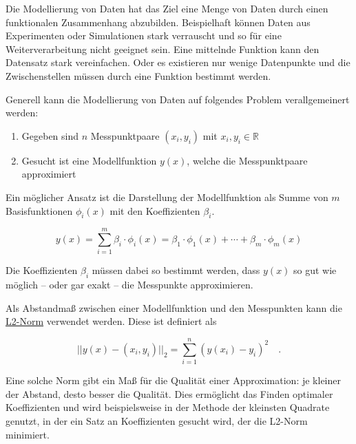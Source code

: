 \documentclass[
  letterpaper,
  DIV=11,
  numbers=noendperiod]{scrreprt}
\providecommand{\tightlist}{%
  \setlength{\itemsep}{0pt}\setlength{\parskip}{0pt}}\usepackage{longtable,booktabs,array}
\begin{document}
\begin{tcolorbox}[enhanced jigsaw, left=2mm, leftrule=.75mm, bottomrule=.15mm, title=\textcolor{quarto-callout-note-color}{\faInfo}\hspace{0.5em}{Theorie - Modellierung}, colback=white, arc=.35mm, breakable, titlerule=0mm, bottomtitle=1mm, colbacktitle=quarto-callout-note-color!10!white, toprule=.15mm, opacityback=0, coltitle=black, rightrule=.15mm, opacitybacktitle=0.6, toptitle=1mm, colframe=quarto-callout-note-color-frame]

Die Modellierung von Daten hat das Ziel eine Menge von Daten durch einen
funktionalen Zusammenhang abzubilden. Beispielhaft können Daten aus
Experimenten oder Simulationen stark verrauscht und so für eine
Weiterverarbeitung nicht geeignet sein. Eine mittelnde Funktion kann den
Datensatz stark vereinfachen. Oder es existieren nur wenige Datenpunkte
und die Zwischenstellen müssen durch eine Funktion bestimmt werden.

Generell kann die Modellierung von Daten auf folgendes Problem
verallgemeinert werden:

\begin{enumerate}
\def\labelenumi{\arabic{enumi}.}
\tightlist
\item
  Gegeben sind \(n\) Messpunktpaare \((x_i, y_i)\) mit
  \(x_i, y_i \in \mathbb{R}\)
\item
  Gesucht ist eine Modellfunktion \(y(x)\), welche die Messpunktpaare
  approximiert
\end{enumerate}

Ein möglicher Ansatz ist die Darstellung der Modellfunktion als Summe
von \(m\) Basisfunktionen \(\phi_i(x)\) mit den Koeffizienten
\(\beta_i\).

\[  y(x) = \sum_{i=1}^{m}\beta_i \cdot \phi_i(x) = \beta_1\cdot \phi_1(x) + \cdots + \beta_m\cdot \phi_m(x) \]

Die Koeffizienten \(\beta_i\) müssen dabei so bestimmt werden, dass
\(y(x)\) so gut wie möglich -- oder gar exakt -- die Messpunkte
approximieren.

Als Abstandmaß zwischen einer Modellfunktion und den Messpunkten kann
die \href{https://de.wikipedia.org/wiki/Folgenraum\#lp}{L2-Norm}
verwendet werden. Diese ist definiert als

\[  || y(x) - (x_i, y_i) ||_2 = \sum_{i=1}^n \left(y(x_i) - y_i\right)^2 \quad .\]

Eine solche Norm gibt ein Maß für die Qualität einer Approximation: je
kleiner der Abstand, desto besser die Qualität. Dies ermöglicht das
Finden optimaler Koeffizienten und wird beispielsweise in der Methode
der kleinsten Quadrate genutzt, in der ein Satz an Koeffizienten gesucht
wird, der die L2-Norm minimiert.

\end{tcolorbox}
\end{document}
